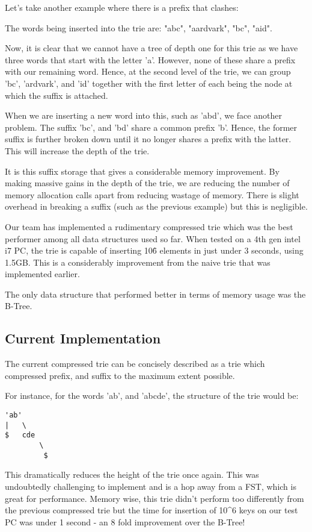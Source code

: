 \documentclass{article}
\begin{document}
Let's take another example where there is a prefix that clashes:

The words being inserted into the trie are: "abc", "aardvark", "bc", "aid".

Now, it is clear that we cannot have a tree of depth one for this trie as we have three words that start with the letter 'a'. However, none of these share a prefix with our remaining word. Hence, at the second level of the trie, we can group 'bc', 'ardvark', and 'id' together with the first letter of each being the node at which the suffix is attached.

When we are inserting a new word into this, such as 'abd', we face another problem. The suffix 'bc', and 'bd' share a common prefix 'b'. Hence, the former suffix is further broken down until it no longer shares a prefix with the latter. This will increase the depth of the trie.

It is this suffix storage that gives a considerable memory improvement. By making massive gains in the depth of the trie, we are reducing the number of memory allocation calls apart from reducing wastage of memory. There is slight overhead in breaking a suffix (such as the previous example) but this is negligible.

Our team has implemented a rudimentary compressed trie which was the best performer among all data structures used so far. When tested on a 4th gen intel i7 PC, the trie is capable of inserting 10\^6 elements in just under 3 seconds, using 1.5GB. This is a considerably improvement from the naive trie that was implemented earlier.

The only data structure that performed better in terms of memory usage was the B-Tree.

\subsection{Current Implementation}

The current compressed trie can be concisely described as a trie which compressed prefix, and suffix to the maximum extent possible. 

For instance, for the words 'ab', and 'abcde', the structure of the trie would be:

\begin{verbatim}
'ab' 
|   \
$   cde
        \  
         $
\end{verbatim}

This dramatically reduces the height of the trie once again. This was undoubtedly challenging to implement and is a hop away from a FST, which is great for performance. Memory wise, this trie didn't perform too differently from the previous compressed trie but the time for insertion of 10^6 keys on our test PC was under 1 second - an 8 fold improvement over the B-Tree!
\end{document}
